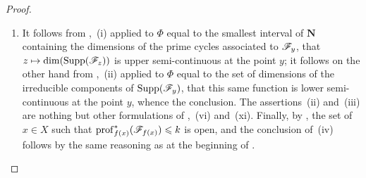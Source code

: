 \begin{proof}
\begin{enumerate}[label=(\roman*)]
  \item It follows from ,~(i) applied to $\Phi$ equal to the smallest interval of $\mathbf{N}$ containing the dimensions of the prime cycles associated to $\mathscr{F}_y$, that $z\mapsto\dim(\operatorname{Supp}(\mathscr{F}_z))$ is upper semi-continuous at the point $y$; it follows on the other hand from ,~(ii) applied to $\Phi$ equal to the set of dimensions of the irreducible components of $\operatorname{Supp}(\mathscr{F}_y)$, that this same function is lower semi-continuous at the point $y$, whence the conclusion.
The assertions~(ii) and~(iii) are nothing but other formulations of ,~(vi) and~(xi).
Finally, by , the set of $x\in X$ such that $\operatorname{prof}_{f(x)}^*(\mathscr{F}_{f(x)})\leqslant k$ is open, and the conclusion of~(iv) follows by the same reasoning as at the beginning of .
\end{enumerate}
\end{proof}

